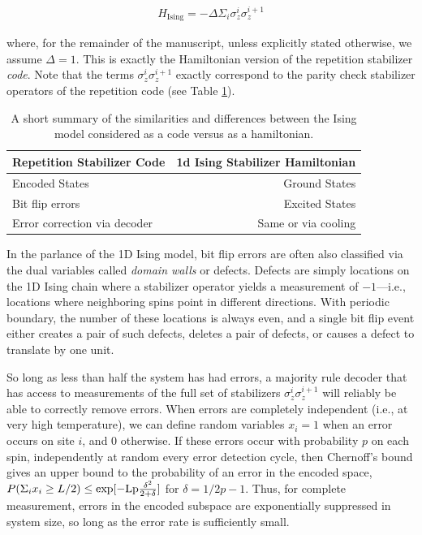 \documentclass[twocolumn,superscriptaddress,aps,prb,floatfix]{revtex4-1}
\newcommand{\Hising}{H_{\mathrm{Ising}}}
\begin{document}
\begin{align}
\Hising = -\Delta \Sigma_i \sigma^i_z \sigma^{i+1}_z
\label{eq:isingham}
\end{align}

where, for the remainder of the manuscript, unless explicitly stated otherwise, we assume $\Delta=1$.  This is exactly the Hamiltonian version of the repetition stabilizer \emph{code}\cite{Freeman2016}.  Note that the terms $\sigma^i_z \sigma^{i+1}_z$ exactly correspond to the parity check stabilizer operators of the repetition code (see Table \ref{tab:code_vs_hamiltonian}).

\begin{table}
\begin{center}
  \begin{tabular}{ l | r }
    \hline
    Repetition Stabilizer Code & 1d Ising Stabilizer Hamiltonian \\ \hline
    Encoded States & Ground States \\ \hline
    Bit flip errors & Excited States \\ \hline
    Error correction via decoder & Same or via cooling \\ \hline
    \hline
  \end{tabular}
\end{center}
\caption{A short summary of the similarities and differences between the Ising model considered as a code versus as a hamiltonian.}
\label{tab:code_vs_hamiltonian}
\end{table}

In the parlance of the 1D Ising model, bit flip errors are often also classified via the dual variables called \emph{domain walls} or defects.  Defects are simply locations on the 1D Ising chain where a stabilizer operator yields a measurement of $-1$---i.e., locations where neighboring spins point in different directions.  With periodic boundary, the number of these locations is always even, and a single bit flip event either creates a pair of such defects, deletes a pair of defects, or causes a defect to translate by one unit.  

So long as less than half the system has had errors, a majority rule decoder that has access to measurements of the full set of stabilizers ${\sigma^i_z \sigma^{i+1}_z}$ will reliably be able to correctly remove errors.  When errors are completely independent (i.e., at very high temperature), we can define random variables $x_i=1$ when an error occurs on site $i$, and $0$ otherwise.  If these errors occur with probability $p$ on each spin, independently at random every error detection cycle, then Chernoff's bound gives an upper bound to the probability of an error in the encoded space, $P(\Sigma_i x_i \geq L/2) \leq \rm{exp}[-Lp\frac{\delta^2}{2+\delta}]$ for $\delta=1/2p-1$.  Thus, for complete measurement, errors in the encoded subspace are exponentially suppressed in system size, so long as the error rate is sufficiently small.
\end{document}
